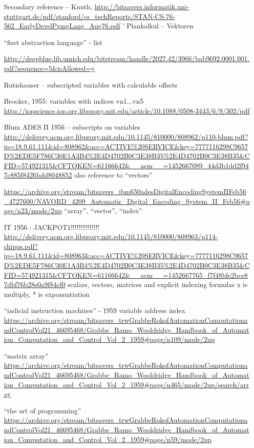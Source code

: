 Secondary reference – Knuth,
\url{http://bitsavers.informatik.uni-stuttgart.de/pdf/stanford/cs_techReports/STAN-CS-76-562_EarlyDevelPgmgLang_Aug76.pdf}
'
Plankalkul – Vektoren


“first abstraction language” - list

\url{http://deepblue.lib.umich.edu/bitstream/handle/2027.42/3966/bab9692.0001.001.pdf?sequence=5&isAllowed=y}

Rutishauser – subscripted variables with calculable offsets

Brooker, 1955: variables with indices vn1...vn5
\url{http://iopscience.iop.org.libproxy.mit.edu/article/10.1088/0508-3443/6/9/302/pdf}

Blum ADES II 1956 – subscripts on variables
\url{http://delivery.acm.org.libproxy.mit.edu/10.1145/810000/808962/p110-blum.pdf?ip=18.9.61.111&id=808962&acc=ACTIVE%20SERVICE&key=7777116298C9657D%2EDE5F786C30E1A3B4%2E4D4702B0C3E38B35%2E4D4702B0C3E38B35&CFID=574921315&CFTOKEN=61166642&__acm__=1452667089_44d3b1dd2f947c885f8426bdd8048852}
also reference to “vectors”

\url{https://archive.org/stream/bitsavers_ibm650adesDigitalEncodingSystemIIFeb56_4727600/NAVORD_4209_Automatic_Digital_Encoding_System_II_Feb56#page/n23/mode/2up}
“array”, “vector”, “index”

IT 1956 : JACKPOT1!!!!!!!!!!!!!!!
\url{http://delivery.acm.org.libproxy.mit.edu/10.1145/810000/808963/p114-chipps.pdf?ip=18.9.61.111&id=808963&acc=ACTIVE%20SERVICE&key=7777116298C9657D%2EDE5F786C30E1A3B4%2E4D4702B0C3E38B35%2E4D4702B0C3E38B35&CFID=574921315&CFTOKEN=61166642&__acm__=1452667765_f7f48bfe2bce87dbf76b28e0a9f84cf0}
scalars, vectors, matrices  and explicit indexing formulas
x is multiply, * is exponentiation


“indicial instruction machines” - 1959
variable address index
\url{https://archive.org/stream/bitsavers_trwGrabbeRokofAutomationComputationandControlVol21_46695468/Grabbe_Ramo_Wooldridge_Handbook_of_Automation_Computation_and_Control_Vol_2_1959#page/n109/mode/2up}

“matrix array”
\url{https://archive.org/stream/bitsavers_trwGrabbeRokofAutomationComputationandControlVol21_46695468/Grabbe_Ramo_Wooldridge_Handbook_of_Automation_Computation_and_Control_Vol_2_1959#page/n465/mode/2up/search/array}

“the art of programming”
\url{https://archive.org/stream/bitsavers_trwGrabbeRokofAutomationComputationandControlVol21_46695468/Grabbe_Ramo_Wooldridge_Handbook_of_Automation_Computation_and_Control_Vol_2_1959#page/n59/mode/2up}

